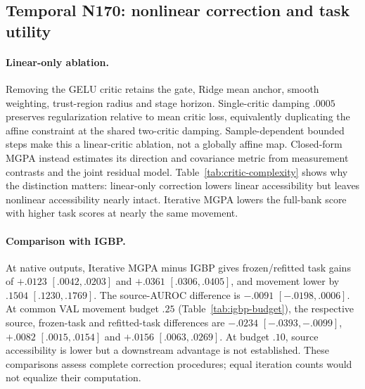 \subsection{Temporal N170: nonlinear correction and task utility}
\label{app:critic-complexity}
\label{app:igbp-comparison}
\paragraph{Linear-only ablation.}
Removing the GELU critic retains the gate, Ridge mean anchor, smooth
weighting, trust-region radius and stage horizon. Single-critic damping
$.0005$ preserves regularization relative to mean critic loss, equivalently
duplicating the affine constraint at the shared two-critic damping.
Sample-dependent bounded steps make this a linear-critic ablation, not a
globally affine map. Closed-form MGPA instead estimates its direction and
covariance metric from measurement contrasts and the joint residual model.
Table~\ref{tab:critic-complexity} shows why the distinction matters:
linear-only correction lowers linear accessibility but leaves nonlinear
accessibility nearly intact. Iterative MGPA lowers the full-bank score
with higher task scores at nearly the same movement.

\begin{table}[htbp]
\centering\small
\caption{\textbf{Nonlinear critics on N170.} A: strongest linear reader $L$
versus full-bank $S$ for the ten participants in Table~\ref{tab:real-main}A.
B: Iterative minus linear-only AUROC percentage points, with paired 95\%
intervals. Iterative estimates average fits; linear-only is deterministic.}
\label{tab:critic-complexity}
\label{tab:critic-complexity-paired}

\end{table}

\paragraph{Comparison with IGBP.}
At native outputs, Iterative MGPA minus IGBP gives frozen/refitted task
gains of $+.0123$ $[.0042,.0203]$ and $+.0361$ $[.0306,.0405]$, and movement
lower by $.1504$ $[.1230,.1769]$. The source-AUROC difference is
$-.0091$ $[-.0198,.0006]$. At common VAL movement budget $.25$
(Table~\ref{tab:igbp-budget}), the respective source, frozen-task and
refitted-task differences are $-.0234$ $[-.0393,-.0099]$,
$+.0082$ $[.0015,.0154]$ and $+.0156$ $[.0063,.0269]$.
At budget $.10$, source accessibility is lower but a downstream advantage
is not established. These comparisons assess complete correction
procedures; equal iteration counts would not equalize their computation.

